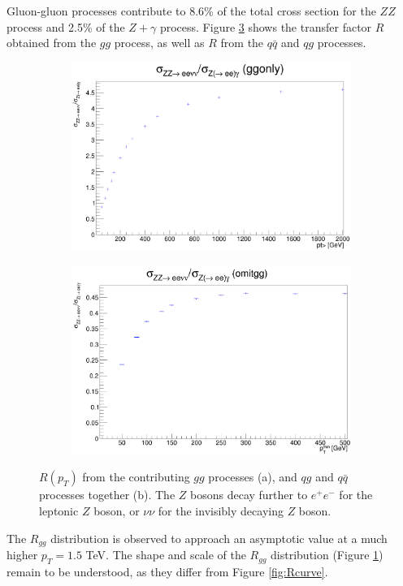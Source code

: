 \documentclass[11pt,a4paper,final]{report}
\begin{document}
Gluon-gluon processes contribute to 8.6\% of the total cross section for the $ZZ$ process and 2.5\% of the $Z+\gamma$ process. Figure \ref{fig:R_gg_qq} shows the transfer factor $R$ obtained from the $gg$ process, as well as $R$ from the $q\bar{q}$ and $qg$ processes.
\begin{figure}[H]
\centering
	\begin{subfigure}{0.49\textwidth}
		\includegraphics[width=\linewidth]{R_ggonly.png}
		\caption{}
		\label{subfig:R_gg}
	\end{subfigure}
	\begin{subfigure}{0.49\textwidth}
		\includegraphics[width=\linewidth]{R_omitgg.png}
		\caption{}
		\label{subfig:R_qq}
	\end{subfigure}	
\caption{$R(p_T)$ from the contributing $gg$ processes (a), and $qg$ and $q\bar{q}$ processes together (b). The $Z$ bosons decay further to $e^+e^-$ for the leptonic $Z$ boson, or $\nu\nu$ for the invisibly decaying $Z$ boson.}
\label{fig:R_gg_qq}
\end{figure}
The $R_{gg}$ distribution is observed to approach an asymptotic value at a much higher $p_T = 1.5$ TeV. The shape and scale of the $R_{gg}$ distribution (Figure \ref{subfig:R_gg}) remain to be understood, as they differ from Figure \ref{fig:Rcurve}.
\end{document}

